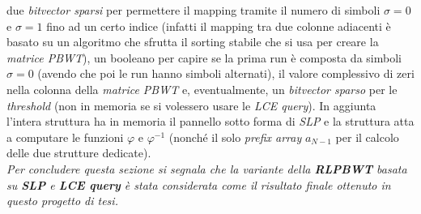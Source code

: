 \documentclass[a4paper,11pt, oneside,italian]{article}
\begin{document}
due \textit{bitvector sparsi} per permettere il mapping tramite il numero di
simboli $\sigma=0$ e $\sigma=1$ fino ad un certo 
indice (infatti il mapping tra due colonne adiacenti è basato su un algoritmo
che sfrutta il sorting stabile che si usa per creare la \textit{matrice PBWT}),
un booleano per capire se la prima run è composta da simboli $\sigma=0$ 
(avendo che poi le run hanno simboli alternati), il valore
complessivo di zeri nella colonna della \textit{matrice PBWT} e, eventualmente,
un \textit{bitvector sparso} per le \textit{threshold} (non in memoria se si
volessero usare le \textit{LCE query}). In aggiunta l'intera struttura ha in
memoria il pannello sotto forma di \textit{SLP} e la struttura atta a computare
le funzioni $\varphi$ e $\varphi^{-1}$ (nonché il solo \textit{prefix array}
$a_{N-1}$ per il calcolo delle due strutture dedicate).\\
\textit{Per concludere questa sezione si segnala che la
  variante 
della \textbf{RLPBWT} basata su \textbf{SLP} e \textbf{LCE query} è stata
considerata come il risultato finale ottenuto in questo progetto di tesi.}
\end{document}
